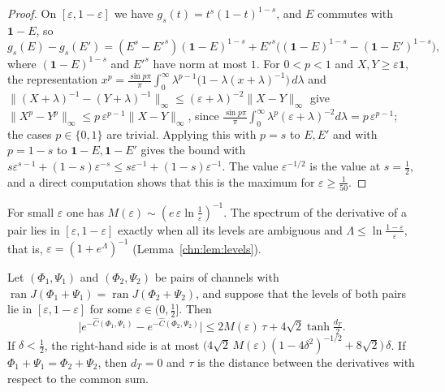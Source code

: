 \begin{proof}
On $[\varepsilon,1-\varepsilon]$ we have $g_s(t)=t^s(1-t)^{1-s}$, and $E$ commutes with $\mathbf 1-E$, so
\[
g_s(E)-g_s(E')=(E^s-E'^s)(\mathbf 1-E)^{1-s}+E'^s\big((\mathbf 1-E)^{1-s}-(\mathbf 1-E')^{1-s}\big),
\]
where $(\mathbf 1-E)^{1-s}$ and $E'^s$ have norm at most $1$. For $0<p<1$ and $X,Y\ge\varepsilon\mathbf 1$, the representation $x^p=\frac{\sin p\pi}{\pi}\int_0^\infty\lambda^{p-1}\big(1-\lambda(x+\lambda)^{-1}\big)\,d\lambda$ and $\|(X+\lambda)^{-1}-(Y+\lambda)^{-1}\|_\infty\le(\varepsilon+\lambda)^{-2}\|X-Y\|_\infty$ give $\|X^p-Y^p\|_\infty\le p\,\varepsilon^{p-1}\|X-Y\|_\infty$, since $\frac{\sin p\pi}{\pi}\int_0^\infty\lambda^p(\varepsilon+\lambda)^{-2}d\lambda=p\,\varepsilon^{p-1}$; the cases $p\in\{0,1\}$ are trivial. Applying this with $p=s$ to $E,E'$ and with $p=1-s$ to $\mathbf 1-E,\mathbf 1-E'$ gives the bound with $s\varepsilon^{s-1}+(1-s)\varepsilon^{-s}\le s\varepsilon^{-1}+(1-s)\varepsilon^{-1}$. The value $\varepsilon^{-1/2}$ is the value at $s=\frac12$, and a direct computation shows that this is the maximum for $\varepsilon\ge\frac1{50}$.
\end{proof}

For small $\varepsilon$ one has $M(\varepsilon)\sim(e\,\varepsilon\ln\frac1\varepsilon)^{-1}$. The spectrum of the derivative of a pair lies in $[\varepsilon,1-\varepsilon]$ exactly when all its levels are ambiguous and $\Lambda\le\ln\frac{1-\varepsilon}{\varepsilon}$, that is, $\varepsilon=(1+e^\Lambda)^{-1}$ (Lemma~\ref{chn:lem:levels}).

\begin{theorem}[Robustness]\label{chn:thm:robust}
Let $(\Phi_1,\Psi_1)$ and $(\Phi_2,\Psi_2)$ be pairs of channels with $\operatorname{ran}J(\Phi_1+\Psi_1)=\operatorname{ran}J(\Phi_2+\Psi_2)$, and suppose that the levels of both pairs lie in $[\varepsilon,1-\varepsilon]$ for some $\varepsilon\in(0,\frac12]$. Then
\[
\big|e^{-\widehat C(\Phi_1,\Psi_1)}-e^{-\widehat C(\Phi_2,\Psi_2)}\big|\le2M(\varepsilon)\,\tau+4\sqrt2\tanh\tfrac{d_T}{2}.
\]
If $\delta<\frac12$, the right-hand side is at most $\big(4\sqrt2\,M(\varepsilon)(1-4\delta^2)^{-1/2}+8\sqrt2\big)\,\delta$. If $\Phi_1+\Psi_1=\Phi_2+\Psi_2$, then $d_T=0$ and $\tau$ is the distance between the derivatives with respect to the common sum.
\end{theorem}

